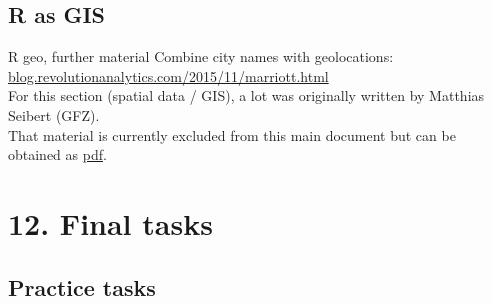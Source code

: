\documentclass[xcolor=table,       handout,    xcolor=dvipsnames]{beamer}\usepackage[]{graphicx}\usepackage[]{color}
\begin{document}
\subsection{R as GIS}

\begin{frame}[fragile]{R geo, further material}
Combine city names with geolocations:\\ \href{http://blog.revolutionanalytics.com/2015/11/marriott.html}{blog.revolutionanalytics.com/2015/11/marriott.html}\\[1em]
For this section (spatial data / GIS), a lot was originally written by Matthias Seibert (GFZ). \\
That material is currently excluded from this main document but can be obtained as \href{https://dl.dropboxusercontent.com/u/4836866/R_course_Berry/RcourseBerry_Mathias.pdf}{pdf}.
\end{frame}

\section{12. Final tasks}

\subsection{Practice tasks}
\end{document}
